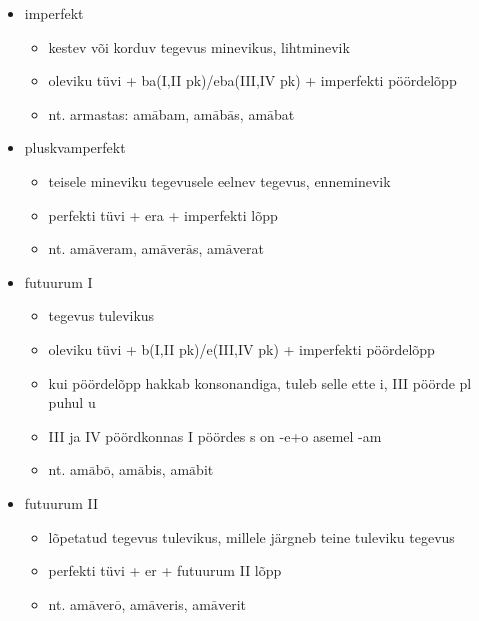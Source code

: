 \documentclass[12pt]{article}
\newcommand{\w}[1]{$\bar{\mbox{#1}}$}
\begin{document}
\begin{itemize}
\begin{itemize}
 \end{itemize}
 \item imperfekt
 \begin{itemize}
  \item kestev või korduv tegevus minevikus, lihtminevik
  \item oleviku tüvi + ba(I,II pk)/eba(III,IV pk) + imperfekti pöördelõpp
  \item nt. armastas: am\w{a}bam, am\w{a}b\w{a}s, am\w{a}bat
 \end{itemize}
 \item pluskvamperfekt
 \begin{itemize}
  \item teisele mineviku tegevusele eelnev tegevus, enneminevik
  \item perfekti tüvi + era + imperfekti lõpp
  \item nt. am\w{a}veram, am\w{a}ver\w{a}s, am\w{a}verat
 \end{itemize}
 \item futuurum I
 \begin{itemize}
  \item tegevus tulevikus
  \item oleviku tüvi + b(I,II pk)/e(III,IV pk) + imperfekti pöördelõpp
  \item kui pöördelõpp hakkab konsonandiga, tuleb selle ette i, III pöörde pl puhul u
  \item III ja IV pöördkonnas I pöördes s on -e+o asemel -am
  \item nt. am\w{a}b\w{o}, am\w{a}bis, am\w{a}bit
 \end{itemize}
 \item futuurum II
 \begin{itemize}
  \item lõpetatud tegevus tulevikus, millele järgneb teine tuleviku tegevus
  \item perfekti tüvi + er + futuurum II lõpp
  \item nt. am\w{a}ver\w{o}, am\w{a}veris, am\w{a}verit
 \end{itemize}
\end{itemize}
\end{document}
